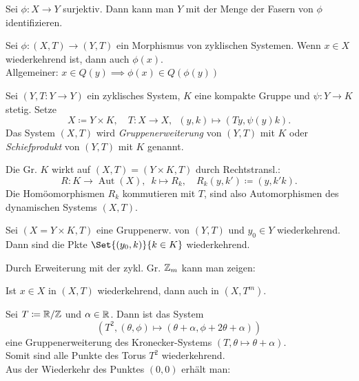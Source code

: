\documentclass{cheat-sheet}
\DeclareMathOperator{\Aut}{Aut} %
\begin{document}
\begin{bem}
  Sei $\phi : X \to Y$ surjektiv. Dann kann man $Y$ mit der Menge der Fasern von $\phi$ identifizieren.
\end{bem}

\begin{thm}
  Sei $\phi : (X, T) \to (Y, T)$ ein Morphismus von zyklischen Systemen.
  Wenn $x \in X$ wiederkehrend ist, dann auch $\phi(x)$. \\
  Allgemeiner: $x \in Q(y) \implies \phi(x) \in Q(\phi(y))$
\end{thm}

\begin{defn}
  Sei $(Y, T : Y \to Y)$ ein zyklisches System, $K$ eine kompakte Gruppe und $\psi : Y \to K$ stetig. Setze
  \[
    X \coloneqq Y \times K, \quad
    T : X \to X, \enspace (y, k) \mapsto (Ty, \psi(y)k).
  \]
  Das System $(X, T)$ wird \emph{Gruppenerweiterung} von $(Y, T)$ mit $K$ oder \emph{Schiefprodukt} von $(Y, T)$ mit $K$ genannt.
\end{defn}

\begin{bem}
  Die Gr. $K$ wirkt auf $(X, T) = (Y \!\times\! K, T)$ durch Rechtstransl.:
  \[
    R : K \to \Aut(X), \enspace k \mapsto R_k, \quad
    R_k(y,k') \coloneqq (y,k'k).
  \]
  Die Homöomorphismen $R_k$ kommutieren mit $T$, sind also Automorphismen des dynamischen Systems $(X, T)$.
\end{bem}

\begin{thm}
  Sei $(X \!=\! Y \!\times\! K, T)$ eine Gruppenerw. von $(Y, T)$ und $y_0 \in Y$ wiederkehrend.
  Dann sind die Pkte $\Set{(y_0, k)}{k \in K}$ wiederkehrend.
\end{thm}

\begin{bem}
  Durch Erweiterung mit der zykl. Gr. $\mathbb{Z}_m$ kann man zeigen:
\end{bem}

\begin{prop}
  Ist $x \in X$ in $(X, T)$ wiederkehrend, dann auch in $(X, T^m)$.
\end{prop}

\begin{bsp}
  Sei $T \coloneqq \mathbb{R} / \mathbb{Z}$ und $\alpha \in \mathbb{R}$. Dann ist das System
  \[ (T^2, (\theta, \phi) \mapsto (\theta + \alpha, \phi + 2 \theta + \alpha)) \]
  eine Gruppenerweiterung des Kronecker-Systems $(T, \theta \mapsto \theta + \alpha)$. \\
  Somit sind alle Punkte des Torus $T^2$ wiederkehrend. \\
  Aus der Wiederkehr des Punktes $(0, 0)$ erhält man:
\end{bsp}
\end{document}
